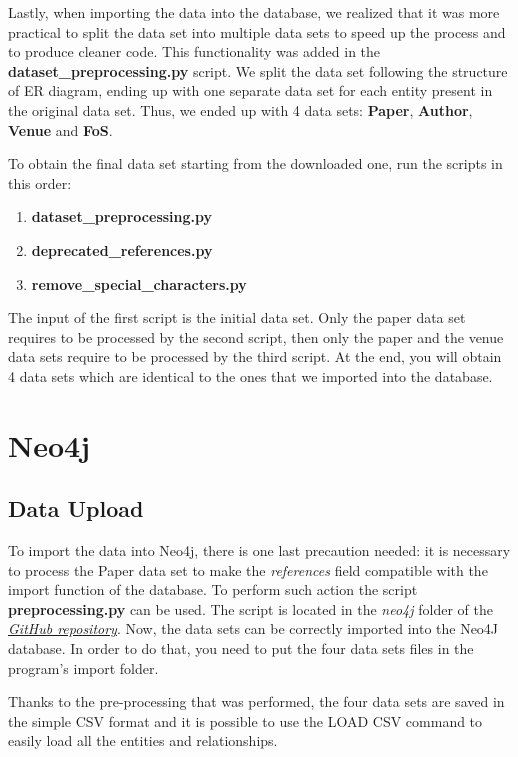 \documentclass{Configuration_Files/PoliMi3i_thesis}
\begin{document}
Lastly, when importing the data into the database, we realized that it was more practical to split the data set into multiple data sets to speed up the process and to produce cleaner code.  This functionality was added in the \textbf{dataset\_preprocessing.py} script. We split the data set following the structure of ER diagram, ending up with one separate data set for each entity present in the original data set. Thus, we ended up with 4 data sets: \textbf{Paper}, \textbf{Author}, \textbf{Venue} and \textbf{FoS}.

To obtain the final data set starting from the downloaded one, run the scripts in this order:

\begin{enumerate}
    \item \textbf{dataset\_preprocessing.py}
    \item \textbf{deprecated\_references.py}
    \item \textbf{remove\_special\_characters.py}
\end{enumerate}

The input of the first script is the initial data set. Only the paper data set requires to be processed by the second script, then only the paper and the venue data sets require to be processed by the third script. 
At the end, you will obtain 4 data sets which are identical to the ones that we imported into the database.

\newpage
\section{Neo4j}
\label{ch:neo}
\subsection{Data Upload}
To import the data into Neo4j, there is one last precaution needed: it is necessary to process the Paper data set to make the \textit{references} field compatible with the import function of the database. To perform such action the script \textbf{preprocessing.py} can be used. The script is located in the \textit{neo4j} folder of the \href{https://github.com/albertopirillo/smbud-project-2022}{\textit{GitHub repository}}.
Now, the data sets can be correctly imported into the Neo4J database. In order to do that, you need to put the four data sets files in the program's import folder. 

Thanks to the pre-processing that was performed, the four data sets are saved in the simple CSV format and it is possible to use the LOAD CSV command to easily load all the entities and relationships.
\end{document}
